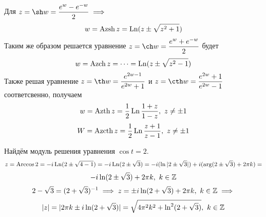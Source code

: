 \documentclass[../../main.tex]{subfiles}
\begin{document}
Для $ z = \sh w = \dfrac{e^{w} - e^{-w}}{2} \implies $
\begin{equation}
\label{lec27:29}
w = \operatorname{Azsh} z = \operatorname{Ln}(z \pm \sqrt{z^2 + 1})
\end{equation}
Таким же образом решается уравнение $ z = \ch w = \dfrac{e^{w} + 
e^{-w}}{2} $ будет 
\begin{equation}
\label{lec27:30}
w = \operatorname{Azch} z = \dots = \operatorname{Ln}(z \pm \sqrt{z^2 - 1})
\end{equation}
Также решая уравнение $ z = \th 
w = \dfrac{e^{2w - 1}}{e^{2w} + 1} $ и 
$ z = \cth w = \dfrac{e^{2w} + 1}{e^{2w} - 1} $ соответсвенно,
получаем
\begin{equation}
\label{lec27:31}
w = \operatorname{Azth} z = \dfrac{1}{2} \operatorname{Ln} \dfrac{1 + z}{1 - z},\ z \neq \pm 1
\end{equation}
\begin{equation}
\label{lec27:32}
W = \operatorname{Azcth} z = \dfrac{1}{2} \operatorname{Ln} \dfrac{z + 1}{z - 1},\
z \neq \pm 1
\end{equation}
\begin{exmp}
	Найдём модуль решения уравнения $ \cos t = 2 $.
	\[
	z = \operatorname{Arccos} 2 = -i\operatorname{Ln}(2 \pm \sqrt{4 - 1}) = 
	-i \operatorname{Ln}(2 \pm \sqrt{3}) = -i (\ln|2 \pm \sqrt{3}|) + i(\arg(2 \pm \sqrt{3}) + 
	2\pi k) = \]\[
	-i \ln(2 \pm \sqrt{3}) + 2\pi k,\ k \in \mathbb{Z}	
	\]
	\[
	2 - \sqrt{3} = (2 + \sqrt{3})^{-1} \implies
	z = \pm i \ln (2 + \sqrt{3}) + 2\pi k,\ k \in \mathbb{Z} \implies \] \[
	|z| = |2\pi k \pm i\ln(2 + \sqrt{3})| = 
	\sqrt{4\pi^2 k^2 + \ln^2(2 + \sqrt{3})},\ k \in \mathbb{Z}
	\]
\end{exmp}
\end{document}

